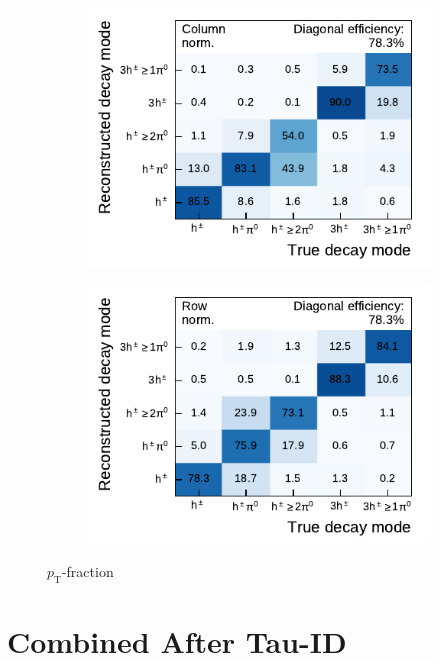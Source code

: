 \begin{figure}[htb]
  \begin{subfigure}[t]{0.48\textwidth}
    \centering
    \includegraphics{./figures/decay_mode_classification/experiments/mig_mat_sub_e_2.pdf}
  \end{subfigure}\hfill
  \begin{subfigure}[t]{0.48\textwidth}
    \centering
    \includegraphics{./figures/decay_mode_classification/experiments/comp_mat_sub_e_2.pdf}
  \end{subfigure}
  \caption{$p_\text{T}$-fraction}
\end{figure}

\clearpage
\section{Combined After Tau-ID}

